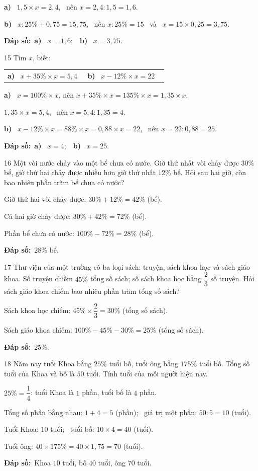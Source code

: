 \documentclass[11pt]{article}
\makeatletter
\newif\ifsol \solfalse
\renewcommand{\arraystretch}{1.35}
\providecommand{\AnsWord}{Đáp số}
\newcommand{\dapso}[1]{\par\textbf{\AnsWord:}\ #1}
\newcommand{\probsol}[1]{%
  \begin{lrbox}{\solmeasure}\begin{minipage}{\dimexpr\linewidth-24pt\relax}#1\end{minipage}\end{lrbox}%
  \ifsol
    \begin{solbox}#1\end{solbox}%
  \else
    \setlength{\solht}{\dimexpr\ht\solmeasure+\dp\solmeasure+0.85cm\relax}%
    \ifdim\solht<1.35cm\setlength{\solht}{1.35cm}\fi
    \begin{tcolorbox}[colback=white,colframe=Line,boxrule=0.8pt,arc=5pt,
      left=8pt,right=8pt,top=4pt,bottom=4pt,height=\solht]{\footnotesize\color{Slate}\itshape\WorkWord}\end{tcolorbox}%
  \fi}
\newcommand{\pa}[1]{\textbf{#1)}\ }
\newenvironment{cols2}{\par\vspace{3pt}\noindent\setlength{\tabcolsep}{0pt}\renewcommand{\arraystretch}{1.3}%
  \begin{tabular}{@{}>{\raggedright\arraybackslash\rule{0pt}{4.4ex}}p{0.48\linewidth}<{\rule[-2.3ex]{0pt}{0pt}}@{\hspace{0.03\linewidth}}>{\raggedright\arraybackslash\rule{0pt}{4.4ex}}p{0.48\linewidth}<{\rule[-2.3ex]{0pt}{0pt}}@{}}}%
  {\end{tabular}\par}
\newcommand{\gap}{\vspace{0.3cm}}
\def\WorkWord{Bài làm:}
\def\AnsWord{Đáp số}
\makeatother
\begin{document}
\probsol{
\pa{a} $1{,}5\times x=2{,}4$, \ nên $x=2{,}4:1{,}5=1{,}6$.\par
\pa{b} $x:25\%+0{,}75=15{,}75$, \ nên $x:25\%=15$ \ và \ $x=15\times0{,}25=3{,}75$.
\dapso{\pa{a} $x=1{,}6$;\ \ \pa{b} $x=3{,}75$.}}
\gap
\begin{probbox}{15}{\relax}
Tìm $x$, biết:
\begin{cols2}
\pa{a} $x+35\%\times x=5{,}4$ & \pa{b} $x-12\%\times x=22$
\end{cols2}
\end{probbox}
\probsol{
\pa{a} $x=100\%\times x$, nên $x+35\%\times x=135\%\times x=1{,}35\times x$.\par
$1{,}35\times x=5{,}4$, \ nên $x=5{,}4:1{,}35=4$.\par
\pa{b} $x-12\%\times x=88\%\times x=0{,}88\times x=22$, \ nên $x=22:0{,}88=25$.
\dapso{\pa{a} $x=4$;\ \ \pa{b} $x=25$.}}
\gap
\begin{probbox}{16}{\relax}
Một vòi nước chảy vào một bể chưa có nước. Giờ thứ nhất vòi chảy được $30\%$ bể, giờ thứ hai chảy được nhiều hơn giờ thứ nhất $12\%$ bể. Hỏi sau hai giờ, còn bao nhiêu phần trăm bể chưa có nước?
\end{probbox}
\probsol{
Giờ thứ hai vòi chảy được: $30\%+12\%=42\%$ (bể).\par
Cả hai giờ chảy được: $30\%+42\%=72\%$ (bể).\par
Phần bể chưa có nước: $100\%-72\%=28\%$ (bể).
\dapso{$28\%$ bể.}}
\gap
\begin{probbox}{17}{\relax}
Thư viện của một trường có ba loại sách: truyện, sách khoa học và sách giáo khoa. Số truyện chiếm $45\%$ tổng số sách; số sách khoa học bằng $\dfrac23$ số truyện. Hỏi sách giáo khoa chiếm bao nhiêu phần trăm tổng số sách?
\end{probbox}
\probsol{
Sách khoa học chiếm: $45\%\times\dfrac23=30\%$ (tổng số sách).\par
Sách giáo khoa chiếm: $100\%-45\%-30\%=25\%$ (tổng số sách).
\dapso{$25\%$.}}
\gap
\begin{probbox}{18}{\relax}
Năm nay tuổi Khoa bằng $25\%$ tuổi bố, tuổi ông bằng $175\%$ tuổi bố. Tổng số tuổi của Khoa và bố là $50$ tuổi. Tính tuổi của mỗi người hiện nay.
\end{probbox}
\probsol{
$25\%=\dfrac14$: tuổi Khoa là $1$ phần, tuổi bố là $4$ phần.\par
Tổng số phần bằng nhau: $1+4=5$ (phần); \ giá trị một phần: $50:5=10$ (tuổi).\par
Tuổi Khoa: $10$ tuổi; \ tuổi bố: $10\times4=40$ (tuổi).\par
Tuổi ông: $40\times175\%=40\times1{,}75=70$ (tuổi).
\dapso{Khoa $10$ tuổi, bố $40$ tuổi, ông $70$ tuổi.}}
\end{document}
